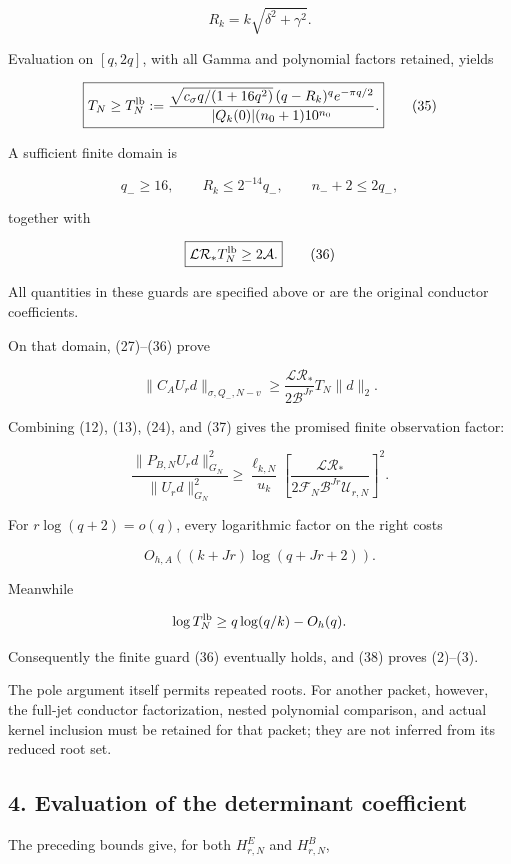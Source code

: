 \documentclass[11pt]{article}
\begin{document}
\[
R_k=k\sqrt{\delta^2+\gamma^2}.
\]

Evaluation on \([q,2q]\), with all Gamma and polynomial factors retained, yields

\[
\boxed{
T_N\ge T_N^{\rm lb}:=
\frac{
\sqrt{c_\sigma q/(1+16q^2)}\,
(q-R_k)^q e^{-\pi q/2}
}{
|Q_k(0)|(n_0+1)10^{n_0}
}.
}
\tag{35}
\]

A sufficient finite domain is

\[
q_-\ge16,\qquad
R_k\le2^{-14}q_-,
\qquad
n_-+2\le2q_-,
\]

together with

\[
\boxed{\mathcal L\mathcal R_*T_N^{\rm lb}\ge2\mathcal A.}
\tag{36}
\]

All quantities in these guards are specified above or are the original conductor coefficients.

On that domain, (27)--(36) prove

\[
\boxed{
\|C_AU_rd\|_{\sigma,Q_-,N-v}
\ge
\frac{\mathcal L\mathcal R_*}
{2\mathcal B^{Jr}}T_N\|d\|_2.
}
\tag{37}
\]

Combining (12), (13), (24), and (37) gives the promised finite observation factor:

\[
\boxed{
\frac{\|P_{B,N}U_rd\|_{G_N}^2}
{\|U_rd\|_{G_N}^2}
\ge
\frac{\ell_{k,N}}{u_k}
\left[
\frac{\mathcal L\mathcal R_*}
{2\mathcal F_N\mathcal B^{Jr}\mathcal U_{r,N}}
\right]^2.
}
\tag{38}
\]

For \(r\log(q+2)=o(q)\), every logarithmic factor on the right costs

\[
O_{h,A}((k+Jr)\log(q+Jr+2)).
\]

Meanwhile

\[
\log T_N^{\rm lb}
\ge q\log(q/k)-O_h(q).
\]

Consequently the finite guard (36) eventually holds, and (38) proves (2)--(3).

The pole argument itself permits repeated roots. For another packet, however, the full-jet conductor factorization, nested polynomial comparison, and actual kernel inclusion must be retained for that packet; they are not inferred from its reduced root set.

\subsection{4. Evaluation of the determinant coefficient}\label{evaluation-of-the-determinant-coefficient}

The preceding bounds give, for both \(H^E_{r,N}\) and \(H^B_{r,N}\),
\end{document}
